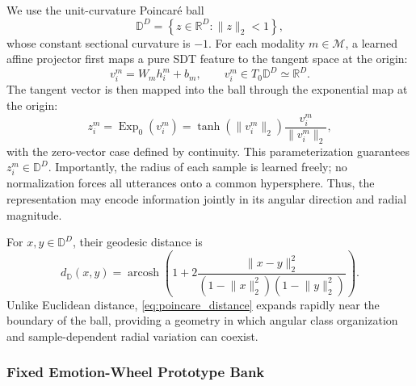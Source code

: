 \documentclass[letterpaper,journal]{IEEEtran}
\begin{document}
We use the unit-curvature Poincar\'e ball
\begin{equation}
    \mathbb{D}^{D}
    =\left\{z\in\mathbb{R}^{D}:\lVert z\rVert_2<1\right\},
    \label{eq:poincare_ball}
\end{equation}
whose constant sectional curvature is \(-1\). For each modality
\(m\in\mathcal{M}\), a learned affine projector first maps a pure SDT feature
to the tangent space at the origin:
\begin{equation}
    v_i^{m}=W_m h_i^{m}+b_m,
    \qquad v_i^{m}\in T_{0}\mathbb{D}^{D}\simeq\mathbb{R}^{D}.
    \label{eq:tangent_projection}
\end{equation}
The tangent vector is then mapped into the ball through the exponential map at
the origin:
\begin{equation}
    z_i^{m}=\operatorname{Exp}_{0}(v_i^{m})
    =\tanh\!\left(\lVert v_i^{m}\rVert_2\right)
    \frac{v_i^{m}}{\lVert v_i^{m}\rVert_2},
    \label{eq:poincare_expmap}
\end{equation}
with the zero-vector case defined by continuity. This parameterization
guarantees \(z_i^{m}\in\mathbb{D}^{D}\). Importantly, the radius of each sample
is learned freely; no normalization forces all utterances onto a common
hypersphere. Thus, the representation may encode information jointly in its
angular direction and radial magnitude.

For \(x,y\in\mathbb{D}^{D}\), their geodesic distance is
\begin{equation}
    d_{\mathbb{D}}(x,y)
    =\operatorname{arcosh}\!\left(
    1+2\frac{\lVert x-y\rVert_2^2}
    {(1-\lVert x\rVert_2^2)(1-\lVert y\rVert_2^2)}
    \right).
    \label{eq:poincare_distance}
\end{equation}
Unlike Euclidean distance, \eqref{eq:poincare_distance} expands rapidly near
the boundary of the ball, providing a geometry in which angular class
organization and sample-dependent radial variation can coexist.

\subsubsection{Fixed Emotion-Wheel Prototype Bank}
\end{document}
